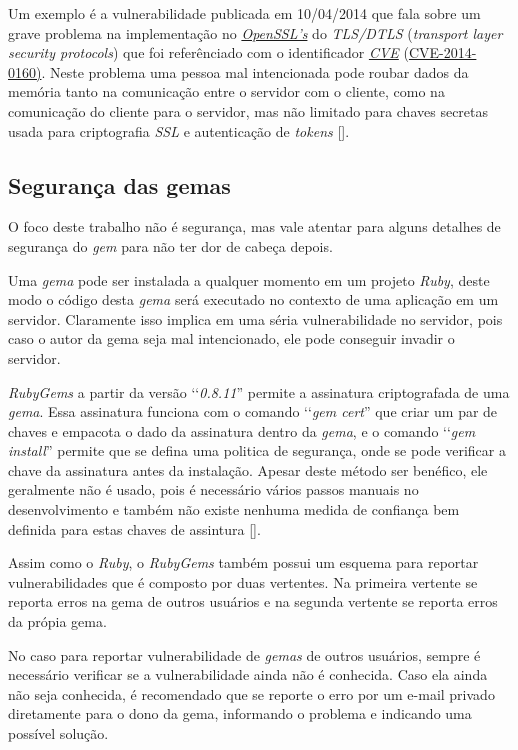 Um exemplo é a vulnerabilidade publicada em 10/04/2014 que fala sobre um grave problema na
implementação no \emph{\href{https://www.openssl.org}{OpenSSL’s}} do \emph{TLS/DTLS} (\emph{transport
layer security protocols}) que foi referênciado com o identificador \emph{\href{https://cve.mitre.org/}{CVE}}
(\href{https://web.nvd.nist.gov/view/vuln/detail?vulnId=CVE-2014-0160}{CVE-2014-0160)}. Neste problema
uma pessoa mal intencionada pode roubar dados da memória tanto na comunicação entre o servidor com o cliente,
como na comunicação do cliente para o servidor, mas não limitado para chaves secretas usada para criptografia
\emph{SSL} e autenticação de \emph{tokens} [].

\subsection{Segurança das gemas}

O foco deste trabalho não é segurança, mas vale atentar para alguns detalhes de segurança do \emph{gem} para
não ter dor de cabeça depois.

Uma \emph{gema} pode ser instalada a qualquer momento em um projeto \emph{Ruby}, deste modo o código desta
\emph{gema} será executado no contexto de uma aplicação em um servidor. Claramente isso implica em uma séria
vulnerabilidade no servidor, pois caso o autor da gema seja mal intencionado, ele pode conseguir invadir o
servidor.

\emph{RubyGems} a partir da versão ‘‘\emph{0.8.11}'' permite a assinatura criptografada de uma \emph{gema}. Essa
assinatura funciona com o comando ‘‘\emph{gem cert}'' que criar um par de chaves e empacota o dado da
assinatura dentro da \emph{gema}, e o comando ‘‘\emph{gem install}'' permite que se defina uma politica de
segurança, onde se pode verificar a chave da assinatura antes da instalação. Apesar deste método
ser benéfico, ele geralmente não é usado, pois é necessário vários passos manuais no desenvolvimento e
também não existe nenhuma medida de confiança bem definida para estas chaves de assintura
[].

Assim como o \emph{Ruby}, o \emph{RubyGems} também possui um esquema para reportar vulnerabilidades que
é composto por duas vertentes. Na primeira vertente se reporta erros na gema de outros usuários e na
segunda vertente se reporta erros da própia gema.

No caso para reportar vulnerabilidade de \emph{gemas} de outros usuários, sempre é necessário verificar
se a vulnerabilidade ainda não é conhecida. Caso ela ainda não seja conhecida, é recomendado que se
reporte o erro por um e-mail privado diretamente para o dono da gema, informando o problema e
indicando uma possível solução.

